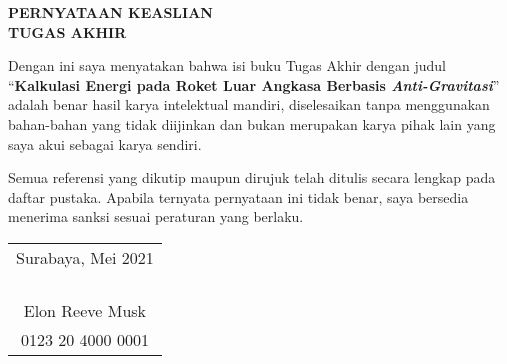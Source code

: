 \begin{center}
  \large\textbf{PERNYATAAN KEASLIAN\\TUGAS AKHIR}
\end{center}

\thispagestyle{empty}

\vspace{2ex}

Dengan ini saya menyatakan bahwa isi buku Tugas Akhir dengan judul
%
``\textbf{Kalkulasi Energi pada Roket Luar Angkasa Berbasis \emph{Anti-Gravitasi}}''
%
adalah benar hasil karya intelektual mandiri, diselesaikan tanpa menggunakan bahan-bahan yang tidak diijinkan dan bukan merupakan karya pihak lain yang saya akui sebagai karya sendiri.

Semua referensi yang dikutip maupun dirujuk telah ditulis secara lengkap pada daftar pustaka.
Apabila ternyata pernyataan ini tidak benar, saya bersedia menerima sanksi sesuai peraturan yang berlaku.

\vspace{4ex}

\begin{flushright}
  \begin{tabular}[b]{c}
    Surabaya, Mei 2021\\
    \\
    \\
    \\
    \\
    Elon Reeve Musk\\
    0123 20 4000 0001
  \end{tabular}
\end{flushright}

